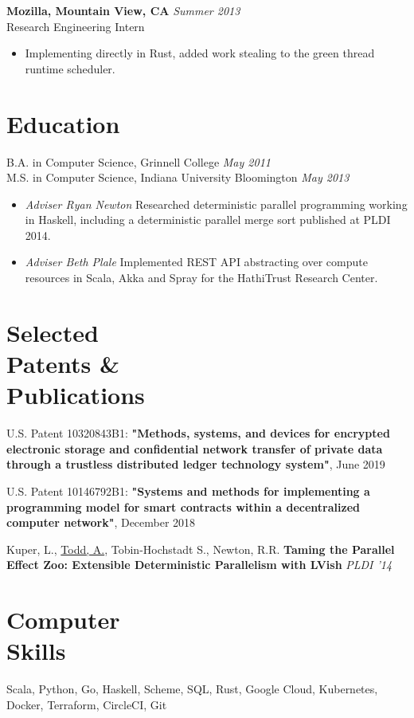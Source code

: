 \documentclass[margin]{res}
\begin{document}
\begin{resume}
 {\bf Mozilla, Mountain View, CA} \hfill \textit{Summer 2013} \\
 Research Engineering Intern
 \begin{itemize} \itemsep -2pt  %
 \item Implementing directly in Rust, added work stealing to the green thread runtime scheduler.
 \end{itemize}
 
\section{Education}
B.A. in Computer Science, Grinnell College \hfill \textit{May 2011} \\
M.S. in Computer Science, Indiana University Bloomington \hfill \textit{May 2013}
 \begin{itemize} \itemsep -2pt
 \item {\it Adviser Ryan Newton} Researched deterministic parallel programming working in Haskell, including a deterministic parallel merge sort published at PLDI 2014.
 \item {\it Adviser Beth Plale} Implemented REST API abstracting over compute resources in Scala, Akka and Spray for the HathiTrust Research Center.
 \end{itemize}
 
\section{Selected \\ Patents \& \\ Publications}

U.S. Patent 10320843B1: {\bf "Methods, systems, and devices for encrypted electronic storage and confidential network transfer of private data through a trustless distributed ledger technology system"}, June 2019

U.S. Patent 10146792B1: {\bf "Systems and methods for implementing a programming model for smart contracts within a decentralized computer network"}, December 2018

Kuper, L., \underline{Todd, A.}, Tobin-Hochstadt S., Newton, R.R. {\bf Taming the Parallel Effect Zoo: Extensible Deterministic Parallelism with LVish} \textit{PLDI '14} 

\section{Computer \\ Skills}
Scala, Python, Go, Haskell, Scheme, SQL, Rust, Google Cloud, Kubernetes, Docker, Terraform, CircleCI, Git
\end{resume} 
\end{document}
